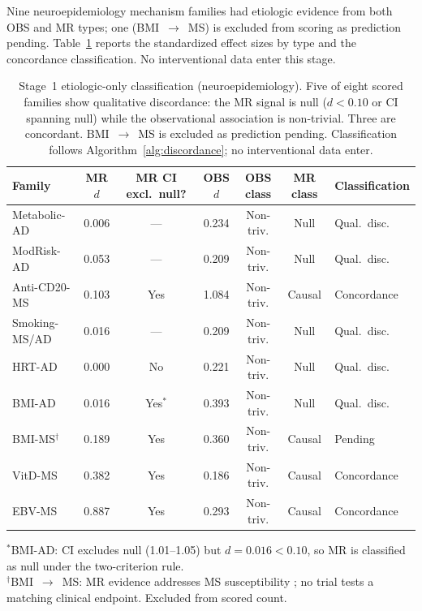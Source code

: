 \documentclass[11pt]{article}
\begin{document}
Nine neuroepidemiology mechanism families had etiologic evidence from both OBS and MR types; one (BMI~$\to$~MS) is excluded from scoring as prediction pending. Table~\ref{tab:stage1} reports the standardized effect sizes by type and the concordance classification. No interventional data enter this stage.

\begin{table}[t]
\centering
\caption{Stage~1 etiologic-only classification (neuroepidemiology). Five of eight scored families show qualitative discordance: the MR signal is null ($d < 0.10$ or CI spanning null) while the observational association is non-trivial. Three are concordant. BMI~$\to$~MS is excluded as prediction pending. Classification follows Algorithm~\ref{alg:discordance}; no interventional data enter.}
\label{tab:stage1}
\begin{tabular}{lcccccl}
\toprule
Family & MR $d$ & MR CI excl.\ null? & OBS $d$ & OBS class & MR class & Classification \\
\midrule
Metabolic-AD & 0.006 & --- & 0.234 & Non-triv. & Null & Qual.\ disc. \\
ModRisk-AD & 0.053 & --- & 0.209 & Non-triv. & Null & Qual.\ disc. \\
Anti-CD20-MS & 0.103 & Yes & 1.084 & Non-triv. & Causal & Concordance \\
Smoking-MS/AD & 0.016 & --- & 0.209 & Non-triv. & Null & Qual.\ disc. \\
HRT-AD & 0.000 & No & 0.221 & Non-triv. & Null & Qual.\ disc. \\
BMI-AD & 0.016 & Yes$^*$ & 0.393 & Non-triv. & Null & Qual.\ disc. \\
BMI-MS$^\dagger$ & 0.189 & Yes & 0.360 & Non-triv. & Causal & Pending \\
VitD-MS & 0.382 & Yes & 0.186 & Non-triv. & Causal & Concordance \\
EBV-MS & 0.887 & Yes & 0.293 & Non-triv. & Causal & Concordance \\
\bottomrule
\end{tabular}

\vspace{1mm}
{\footnotesize $^*$BMI-AD: CI excludes null (1.01--1.05) but $d = 0.016 < 0.10$, so MR is classified as null under the two-criterion rule.\\
$^\dagger$BMI~$\to$~MS: MR evidence addresses MS susceptibility \cite{mokry2016obesity}; no trial tests a matching clinical endpoint. Excluded from scored count.}
\end{table}
\end{document}
